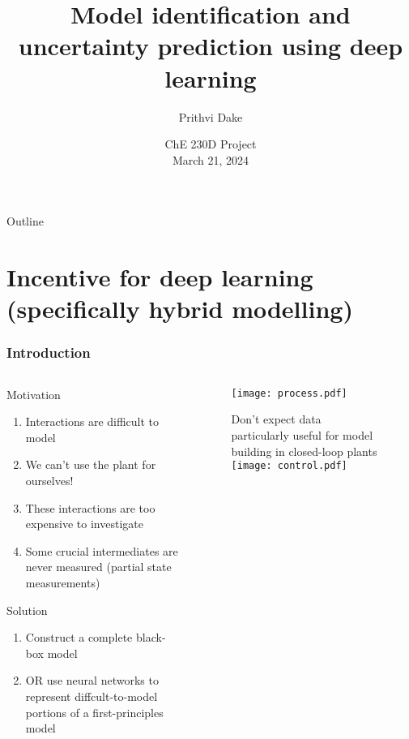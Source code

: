 \documentclass[dvipsnames, 9pt]{beamer}
\title[Model identification]{Model identification and uncertainty prediction using deep learning}
\author[ChE230D---Dake]{Prithvi Dake}
\institute [UCSB]{Department of Chemical
  Engineering\\
    \pgfuseimage{ucsb-logo}}
\date{ChE 230D Project \\
March 21, 2024}
\begin{document}
\frame{\titlepage}




\begin{frame}{Outline} 
\tableofcontents
\end{frame}

\section{Incentive for deep learning (specifically hybrid modelling)}
\begin{frame}
    \frametitle{Introduction}
    
    \begin{columns}
    {   \begin{column}{0.45\textwidth}
        \begin{block}{Motivation}
        \begin{enumerate}
        \item Interactions are difficult to model
        \item We can't use the plant for ourselves!
        \item These interactions are too expensive to investigate
        \item Some crucial intermediates are never measured (partial state measurements)
        \end{enumerate}
\end{block}
\begin{block}{Solution}
\begin{enumerate}
\item Construct a complete black-box model
\item OR use neural networks to represent diffcult-to-model portions of a first-principles model
\end{enumerate}
\end{block}
        \end{column}}
        \begin{column}{0.55\textwidth}
            \begin{figure}

\texttt{[image: process.pdf]}

Don't expect data particularly useful for model building in closed-loop plants
\texttt{[image: control.pdf]}
 \end{figure}
        \end{column}
    \end{columns}
\end{frame}
\end{document}
